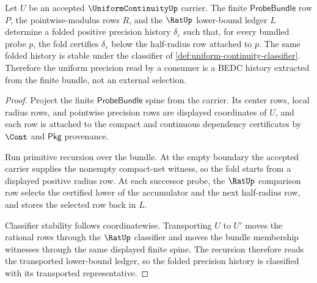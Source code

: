 \begin{theorem}
\label{thm:uniform-continuity-finite-net-modulus-fold}
Let $U$ be an accepted $\UniformContinuityUp$ carrier. The finite
$\mathsf{ProbeBundle}$ row $P$, the pointwise-modulus rows $R$, and the
$\RatUp$ lower-bound ledger $L$ determine a folded positive precision history
$\delta_\varepsilon$ such that, for every bundled probe $p$, the fold certifies
$\delta_\varepsilon$ below the half-radius row attached to $p$. The same
folded history is stable under the classifier of
\autoref{def:uniform-continuity-classifier}. Therefore the uniform precision
read by a consumer is a BEDC history extracted from the finite bundle, not an
external selection.
\end{theorem}
\begin{proof}
Project the finite $\mathsf{ProbeBundle}$ spine from the carrier. Its center
rows, local radius rows, and pointwise precision rows are displayed
coordinates of $U$, and each row is attached to the compact and continuous
dependency certificates by $\Cont$ and $\mathsf{Pkg}$ provenance.

Run primitive recursion over the bundle. At the empty boundary the accepted
carrier supplies the nonempty compact-net witness, so the fold starts from a
displayed positive radius row. At each successor probe, the $\RatUp$ comparison
row selects the certified lower of the accumulator and the next half-radius
row, and stores the selected row back in $L$.

Classifier stability follows coordinatewise. Transporting $U$ to $U'$ moves
the rational rows through the $\RatUp$ classifier and moves the bundle
membership witnesses through the same displayed finite spine. The recursion
therefore reads the transported lower-bound ledger, so the folded precision
history is classified with its transported representative.
\end{proof}

